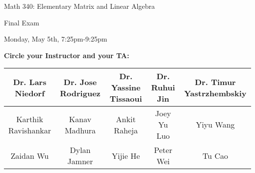 \documentclass[12pt]{extarticle}
\begin{document}
\vspace{-.25in}

\LARGE{Math 340: Elementary Matrix and Linear Algebra}

\bigskip

\Huge{Final Exam} \normalsize

\bigskip

Monday, May 5th, 7:25pm-9:25pm
\vspace{.12in}

\textbf{Circle your Instructor and your TA:}

\begin{table}[h]\centering \small
\begin{tabular}{|c|c|c|c|c|}
\hline
Dr. Lars Niedorf &  Dr. Jose Rodriguez & Dr. Yassine Tissaoui & Dr. Ruhui Jin & Dr. Timur Yastrzhembskiy \\ \hline
Karthik Ravishankar & Kanav Madhura & Ankit Raheja & Joey Yu Luo & Yiyu Wang\\ \hline
Zaidan Wu & Dylan Jamner & Yijie He & Peter Wei & Tu Cao\\ \hline

\end{tabular}
\end{table}






\vspace{-.25in}
\end{document}
